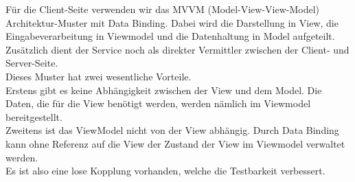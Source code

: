 Für die Client-Seite verwenden wir das MVVM (Model-View-View-Model) Architektur-Muster mit Data Binding. 
Dabei wird die Darstellung in View, die Eingabeverarbeitung in Viewmodel und die Datenhaltung in Model aufgeteilt. Zusätzlich dient der Service noch als direkter Vermittler zwischen der Client- und Server-Seite. \\
Dieses Muster hat zwei wesentliche Vorteile.\\
Erstens gibt es keine Abhängigkeit zwischen der View und dem Model. Die Daten, die für die View benötigt werden, werden nämlich im Viewmodel bereitgestellt. \\
Zweitens ist das ViewModel nicht von der View abhängig. Durch Data Binding kann ohne Referenz auf die View der Zustand der View im Viewmodel verwaltet werden. \\
Es ist also eine lose Kopplung vorhanden, welche die Testbarkeit verbessert.
